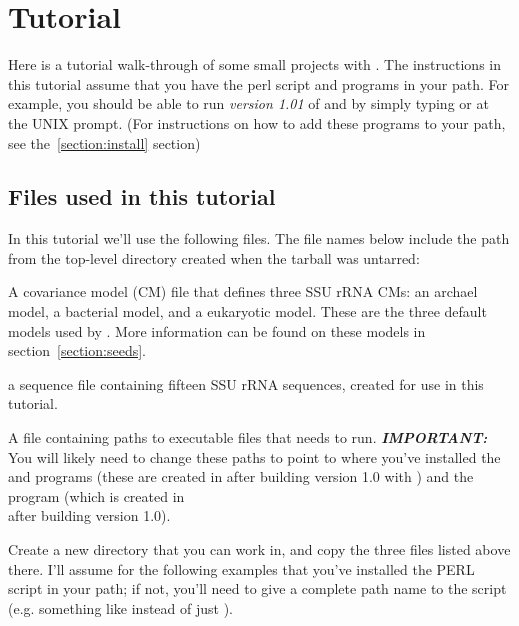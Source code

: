 \section{Tutorial}

Here is a tutorial walk-through of some small projects with
. The instructions in this tutorial assume that you
have the  perl script and  programs in your
path. For example, you should be able to run \emph{version 1.01}
of  and  by simply typing 
 or  at the UNIX prompt.
(For instructions on how to add these programs to your path, see
the~\ref{section:install} section)

\subsection{Files used in this tutorial}

In this tutorial we'll use the following files. The file names below
include the path from the top-level  directory
created when the  tarball was untarred:

  \begin{sreitems}{}
  \item[\prog{./seeds/ssu3-0p1.cm}] A covariance model (CM) file that
    defines three SSU rRNA CMs: an archael model, a bacterial model,
    and a eukaryotic model. These are the three default models used by
    . More information can be found on these models
    in section~\ref{section:seeds}.
  \item[\prog{tutorial/seeds-15.fa}] a sequence file containing
    fifteen SSU rRNA sequences, created for use in this tutorial.
  \item[\prog{./sa-0p1.params}] A file containing paths to
     executable files that  needs
    to run. \textbf{\emph{IMPORTANT:}} You will likely need to change
    these paths to point to where you've installed the 
    and  programs (these are created in
     after building  version
    1.0 with ) and the 
    program (which is created in \\ 
    after building  version 1.0).
  \end{sreitems}

Create a new directory that you can work in, and copy the three
files listed above there. I'll assume for the following examples that you've
installed the  PERL script in your path; if not, you'll
need to give a complete path name to the script (e.g. something like
\newline
{} 
instead of just ).

